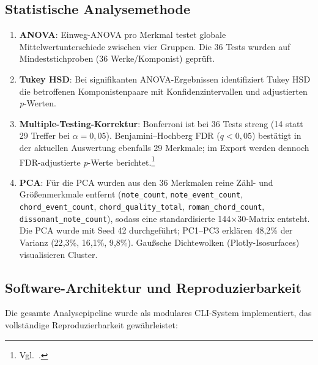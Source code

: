 \documentclass[12pt,a4paper]{article}
\theoremstyle{definition}
\begin{document}
\subsection{Statistische Analysemethode}
\begin{enumerate}
    \item \textbf{ANOVA}: Einweg-ANOVA pro Merkmal testet globale Mittelwertunterschiede zwischen vier Gruppen. Die 36 Tests wurden auf Mindeststichproben (36 Werke/Komponist) geprüft.
    \item \textbf{Tukey HSD}: Bei signifikanten ANOVA-Ergebnissen identifiziert Tukey HSD die betroffenen Komponistenpaare mit Konfidenzintervallen und adjustierten \textit{p}-Werten.
    \item \textbf{Multiple-Testing-Korrektur}: Bonferroni ist bei 36 Tests streng (14 statt 29 Treffer bei \(\alpha=0{,}05\)). Benjamini--Hochberg FDR (\(q<0{,}05\)) bestätigt in der aktuellen Auswertung ebenfalls 29 Merkmale; im Export werden dennoch FDR-adjustierte \textit{p}-Werte berichtet.\footnote{Vgl.\ \cite{Benjamini1995}.}
    \item \textbf{PCA}: Für die PCA wurden aus den 36 Merkmalen reine Zähl- und Größenmerkmale entfernt (\texttt{note\_count}, \texttt{note\_event\_count}, \texttt{chord\_event\_count}, \texttt{chord\_quality\_total}, \texttt{roman\_chord\_count}, \texttt{dissonant\_note\_count}), sodass eine standardisierte 144×30-Matrix entsteht. Die PCA wurde mit Seed 42 durchgeführt; PC1--PC3 erklären 48{,}2\% der Varianz (22{,}3\%, 16{,}1\%, 9{,}8\%). Gaußsche Dichtewolken (Plotly-Isosurfaces) visualisieren Cluster.
\end{enumerate}

\subsection{Software-Architektur und Reproduzierbarkeit}
Die gesamte Analysepipeline wurde als modulares CLI-System implementiert, das vollständige Reproduzierbarkeit gewährleistet:
\end{document}
